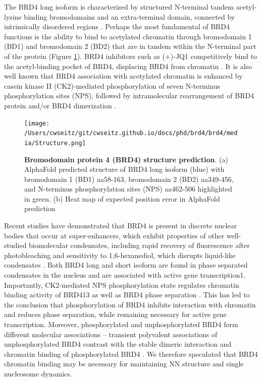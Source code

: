 The BRD4 long isoform is characterized by structured N-terminal tandem acetyl-lysine binding bromodomains and an extra-terminal domain, connected by intrinsically disordered regions \parencite{Han2020}. Perhaps the most fundamental of BRD4 functions is the ability to bind to acetylated chromatin through bromodomain 1 (BD1) and bromodomain 2 (BD2) that are in tandem within the N-terminal part of the protein (Figure \ref{fig:fig22}). BRD4 inhibitors such as (+)-JQ1 competitively bind to the acetyl-binding pocket of BRD4, displacing BRD4 from chromatin \parencite{Filippakopoulos2010}. It is also well known that BRD4 association with acetylated chromatin is enhanced by casein kinase II (CK2)-mediated phosphorylation of seven N-terminus phosphorylation sites (NPS), followed by intramolecular rearrangement of BRD4 protein and/or BRD4 dimerization \parencite{Wu2013,Malvezzi2021}.

\begin{figure}[t]
\centering
\texttt{[image: /Users/cwseitz/git/cwseitz.github.io/docs/phd/brd4/brd4/media/Structure.png]}
\caption{\textbf{Bromodomain protein 4 (BRD4) structure prediction}. (a) AlphaFold predicted structure of BRD4 long isoform (blue) with bromodomain 1 (BD1) aa58-163, bromodomain 2 (BD2) aa349-456, and N-terminus phosphorylation sites (NPS) aa462-506 highlighted in green. (b) Heat map of expected position error in AlphaFold prediction}
\label{fig:fig22}
\end{figure}

Recent studies have demonstrated that BRD4 is present in discrete nuclear bodies that occur at super-enhancers, which exhibit properties of other well-studied biomolecular condensates, including rapid recovery of fluorescence after photobleaching and sensitivity to 1,6-hexanediol, which disrupts liquid-like condensates \parencite{Sabari2018}. Both BRD4 long and short isoform are found in phase separated condensates in the nucleus and are associated with active gene transcription1. Importantly, CK2-mediated NPS phosphorylation state regulates chromatin binding activity of BRD413 as well as BRD4 phase separation \parencite{Han2020}. This has led to the conclusion that phosphorylation of BRD4 inhibits interaction with chromatin and reduces phase separation, while remaining necessary for active gene transcription. Moreover, phosphorylated and unphosphorylated BRD4 form different molecular associations – transient polyvalent associations of unphosphorylated BRD4 contrast with the stable dimeric interaction and chromatin binding of phosphorylated BRD4 \parencite{Malvezzi2021}. We therefore speculated that BRD4 chromatin binding may be necessary for maintaining NN structure and single nucleosome dynamics. 


